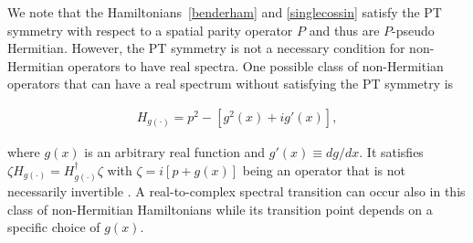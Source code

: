 \documentclass{tADP2e}
\theoremstyle{plain}
\newcommand{\eqn}[1]{
\begin{eqnarray}
	#1
\end{eqnarray}
}
\theoremstyle{plain}
\theoremstyle{definition}
\begin{document}
{We note that the Hamiltonians~\eqref{benderham} and \eqref{singlecossin} satisfy the PT symmetry with respect to a spatial parity operator $P$ and thus are $P$-pseudo Hermitian. However, the PT symmetry is not a necessary condition for non-Hermitian operators to have real spectra. One possible class of non-Hermitian operators that can have a real spectrum without satisfying the PT symmetry is \cite{NS16}
\eqn{\label{quasiherexmp}
H_{g(\cdot)}=p^2-\left[g^2(x)+ig'(x)\right],
} 
where $g(x)$ is an arbitrary real function and $g'(x)\equiv dg/dx$. It satisfies $\zeta H_{g(\cdot)}=H^{\dagger}_{g(\cdot)}\zeta$ with $\zeta=i[p+g(x)]$ being an operator that is not necessarily invertible  \cite{NS16}. A real-to-complex spectral transition can occur also in this class of non-Hermitian Hamiltonians while its transition point depends on a specific choice of $g(x)$.
}
\end{document}
